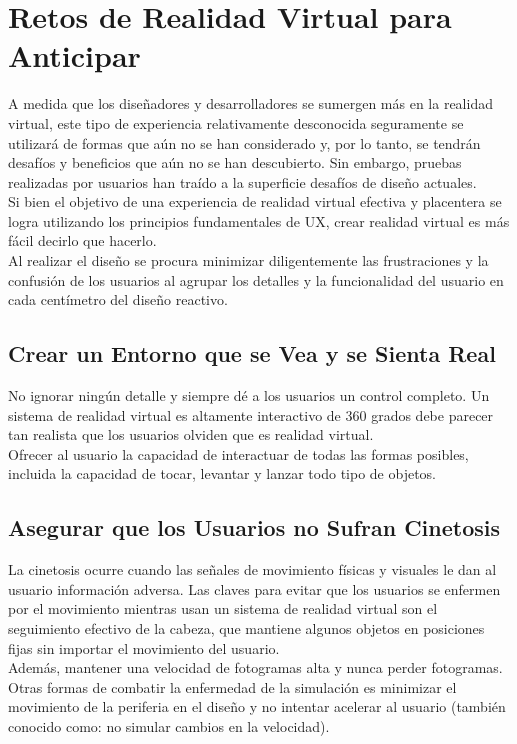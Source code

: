 \section{Retos de Realidad Virtual para Anticipar}
A medida que los diseñadores y desarrolladores se sumergen más en la realidad virtual, este tipo de experiencia relativamente desconocida seguramente se utilizará de formas que 
aún no se han considerado y, por lo tanto, se tendrán desafíos y beneficios que aún no se han descubierto. Sin embargo, pruebas realizadas por usuarios\cite{web19} han traído a la 
superficie desafíos de diseño actuales.\\
Si bien el objetivo de una experiencia de realidad virtual efectiva y placentera se logra utilizando los principios fundamentales de UX, crear realidad virtual es más fácil 
decirlo que hacerlo.\\
Al realizar el diseño se procura minimizar diligentemente las frustraciones y la confusión de los usuarios al agrupar los detalles y la funcionalidad del usuario en cada 
centímetro del diseño reactivo.

\subsection{Crear un Entorno que se Vea y se Sienta Real}
No ignorar ningún detalle y siempre dé a los usuarios un control completo. Un sistema de realidad virtual es altamente interactivo de 360 grados debe parecer tan realista que los 
usuarios olviden que es realidad virtual. \\
Ofrecer al usuario la capacidad de interactuar de todas las formas posibles, incluida la capacidad de tocar, levantar y lanzar todo tipo de objetos.

\subsection{Asegurar que los Usuarios no Sufran Cinetosis}
La cinetosis ocurre cuando las señales de movimiento físicas y visuales le dan al usuario información adversa. Las claves para evitar que los usuarios se enfermen por el movimiento 
mientras usan un sistema de realidad virtual son el seguimiento efectivo de la cabeza, que mantiene algunos objetos en posiciones fijas sin importar el movimiento del usuario.\\
Además, mantener una velocidad de fotogramas alta y nunca perder fotogramas. Otras formas de combatir la enfermedad de la simulación es minimizar el movimiento de la periferia 
en el diseño y no intentar acelerar al usuario (también conocido como: no simular cambios en la velocidad).

